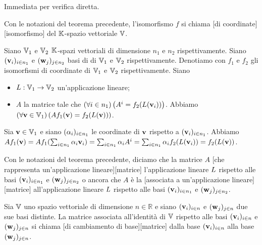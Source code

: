\Proof Immediata per verifica diretta. \EndProof
\begin{Definition}
	Con le notazioni del teorema precedente, l'isomorfismo $f$ si chiama [di coordinate][isomorfismo] del $\mathbb{K}$-spazio vettoriale $\mathbb{V}$.
\end{Definition}
\begin{Theorem}
	Siano $\mathbb{V}_1$ e $\mathbb{V}_2$ $\mathbb{K}$-spazi vettoriali di dimensione $n_1$ e $n_2$ rispettivamente. Siano $(\mathbf{v}_i)_{i \in n_1}$ e $(\mathbf{w}_j)_{j \in n_2}$ basi di di $\mathbb{V}_1$ e $\mathbb{V}_2$ rispettivamente. Denotiamo con $f_1$ e $f_2$ gli isomorfismi di coordinate di $\mathbb{V}_1$ e $\mathbb{V}_2$ rispettivamente. Siano
	\begin{itemize}
		\item $L: \mathbb{V}_1 \rightarrow \mathbb{V}_2$ un'applicazione lineare;
		\item $A$ la matrice tale che $\left ( \forall i \in n_1 \right ) \left ( A^i = f_2(L(\mathbf{v}_i)) \right )$. Abbiamo $\left ( \forall \mathbf{v} \in \mathbb{V}_1 \right ) \left ( A f_1(\mathbf{v}) = f_2(L(\mathbf{v})) \right )$.
	\end{itemize}
\end{Theorem}
\Proof Sia $\mathbf{v} \in \mathbb{V}_1$ e siano $(\alpha_i)_{i \in n_1}$ le coordinate di $\mathbf{v}$ rispetto a $(\mathbf{v}_i)_{i \in n_1}$. Abbiamo $A f_1(\mathbf{v}) = A f_1(\sum_{i \in n_1} \alpha_i \mathbf{v}_i) = \sum_{i \in n_1} \alpha_i A^i = \sum_{i \in n_1} \alpha_i f_2(L(\mathbf{v}_i)) = f_2(L(\mathbf{v}))$. \EndProof
\begin{Definition}
	Con le notazioni del teorema precedente, diciamo che la matrice $A$ [che rappresenta un'applicazione lineare][matrice] l'applicazione lineare $L$ rispetto alle basi $(\mathbf{v}_i)_{i \in n_1}$ e $(\mathbf{w}_j)_{j \in n_2}$ o ancora che $A$ \`e la [associata a un'applicazione lineare][matrice] all'applicazione lineare $L$ rispetto alle basi $(\mathbf{v}_i)_{i \in n_1}$ e $(\mathbf{w}_j)_{j \in n_2}$.
\end{Definition}
\begin{Definition}
	Sia $\mathbb{V}$ uno spazio vettoriale di dimensione $n \in \mathbb{R}$ e siano $(\mathbf{v}_i)_{i \in n}$ e $(\mathbf{w}_j)_{j \in n}$ due sue basi distinte. La matrice associata all'identit\`a di $\mathbb{V}$ rispetto alle basi $(\mathbf{v}_i)_{i \in n}$ e $(\mathbf{w}_j)_{j \in n}$ si chiama [di cambiamento di base][matrice] dalla base $(\mathbf{v}_i)_{i \in n}$ alla base $(\mathbf{w}_j)_{j \in n}$.
\end{Definition}
